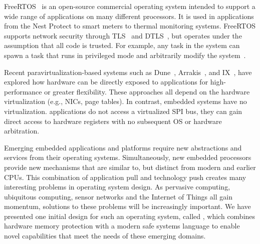 FreeRTOS~\cite{freertos} is an open-source commercial operating system intended to
support a wide range of applications on many different processors. It
is used in applications from the Nest Protect to smart meters to
thermal monitoring systems. FreeRTOS supports network security
through TLS~\cite{tls} and DTLS~\cite{dtls}, but operates under the
assumption that all code is trusted. For example, any task in the system
can spawn a task that runs in privileged mode and arbitrarily modify
the system~\cite{rtos-tasks,rtos-sec}.

Recent paravirtualization-based systems such as Dune~\cite{dune:osdi2012},
 Arrakis~\cite{arrakis:osdi2014}, and IX~\cite{ix:osdi2014}, have explored how hardware can
be directly exposed to applications for high-performance or greater
flexibility. These approaches all depend on the hardware virtualization (e.g.,
NICs, page tables). In contrast, embedded
systems have no virtualization. \name applications do not access a virtualized
SPI bus, they can gain direct access to hardware registers with no subsequent
OS or hardware arbitration.

Emerging embedded applications and platforms require new abstractions and
services from their operating systems. Simultaneously, new embedded processors
provide new mechanisms that are similar to, but distinct from modern and
earlier CPUs. This combination of application pull and technology push
creates many interesting problems in operating system design. As pervasive
computing, ubiquitous computing, sensor networks and the Internet of Things
all gain momentum, solutions to these problems will be increasingly 
important. We have presented one initial design for such an operating system,
called \name, which combines hardware memory protection with a modern
safe systems language to enable novel capabilities that meet the needs
of these emerging domains.
